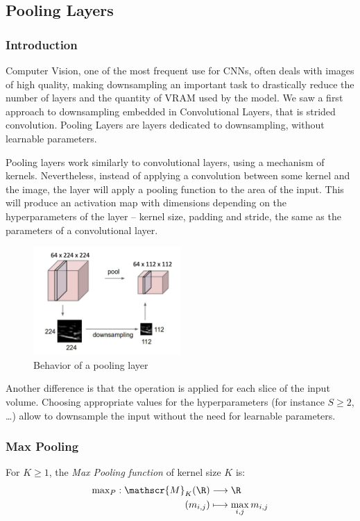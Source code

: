 \subsection{Pooling Layers}
\subsubsection{Introduction}
Computer Vision, one of the most frequent use for CNNs, often deals with images of high quality, making downsampling an important task to drastically reduce the number of layers and the quantity of VRAM used by the model. We saw a first approach to downsampling embedded in Convolutional Layers, that is strided convolution. Pooling Layers are layers dedicated to downsampling, without learnable parameters.

Pooling layers work similarly to convolutional layers, using a mechanism of kernels. Nevertheless, instead of applying a convolution between some kernel and the image, the layer will apply a pooling function to the area of the input. This will produce an activation map with dimensions depending on the hyperparameters of the layer -- kernel size, padding and stride, the same as the parameters of a convolutional layer.

\begin{figure}[H]
    \centering
    \includegraphics[width=0.5\textwidth]{images/pooling-layer.png}
    \caption{Behavior of a pooling layer}
\end{figure}
Another difference is that the operation is applied for each slice of the input volume. Choosing appropriate values for the hyperparameters (for instance $S\geq2$, \dots) allow to downsample the input without the need for learnable parameters.

\subsubsection{Max Pooling}
\begin{definition}
    For $K\geq 1$, the \emph{Max Pooling function} of kernel size $K$ is:
    \begin{equation*}
        \begin{aligned}
            \textnormal{max}_P: \mathscr{M}_{K}(\R) &\longrightarrow \R\\
            (m_{i, j}) &\longmapsto \max_{i, j} m_{i, j}
        \end{aligned}
    \end{equation*}
\end{definition}

